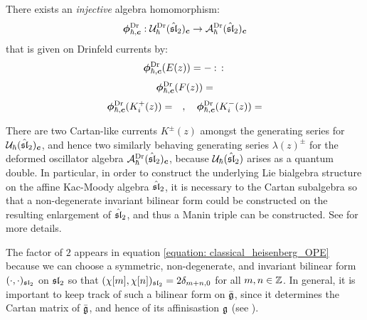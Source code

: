             \begin{proposition} \label{prop: free_boson_realisation_quantum_affine_sl_2_drinfeld_current_presentation}
                There exists an \textit{injective} algebra homomorphism:
                    \begin{equation} \label{equation: free_boson_realisation_quantum_affine_sl_2_drinfeld_current_presentation}
                        \freeboson^{\current}_{\hbar, \level}: \calU_{\hbar}^{\current}(\hat{\sl}_2)_{\level} \to \calA_{\hbar}^{\current}(\hat{\sl}_2)_{\level}
                    \end{equation}
                that is given on Drinfeld currents by:
                    \begin{equation}
                        \freeboson^{\current}_{\hbar, \level}( E(z) ) = -\order{  }
                    \end{equation}
                    \begin{equation}
                        \freeboson^{\current}_{\hbar, \level}( F(z) ) =
                    \end{equation}
                    \begin{equation}
                        \freeboson^{\current}_{\hbar, \level}( K_i^+(z) ) = \quad, \quad \freeboson^{\current}_{\hbar, \level}( K_i^-(z) ) =
                    \end{equation}
            \end{proposition}

            \begin{remark}
                There are two Cartan-like currents $K^{\pm}(z)$ amongst the generating series for $\calU_{\hbar}(\hat{\sl}_2)_{\level}$, and hence two similarly behaving generating series $\lambda(z)^{\pm}$ for the deformed oscillator algebra $\calA_{\hbar}^{\current}(\hat{\sl}_2)_{\level}$, because $\calU_{\hbar}(\hat{\sl}_2)$ arises as a quantum double. In particular, in order to construct the underlying Lie bialgebra structure on the affine Kac-Moody algebra $\hat{\sl}_2$, it is necessary to  the Cartan subalgebra so that a non-degenerate invariant bilinear form could be constructed on the resulting enlargement of $\hat{\sl}_2$, and thus a Manin triple can be constructed. See \cite{etingof_kazhdan_quantisation_6} for more details. 
            \end{remark}

            \begin{remark}
                The factor of $2$ appears in equation \eqref{equation: classical_heisenberg_OPE} because we can choose a symmetric, non-degenerate, and invariant bilinear form $(\cdot, \cdot)_{\sl_2}$ on $\sl_2$ so that $( \chi[m], \chi[n] )_{\sl_2} = 2 \delta_{m + n, 0}$ for all $m, n \in \Z$. In general, it is important to keep track of such a bilinear form on $\bar{\g}$, since it determines the Cartan matrix of $\bar{\g}$, and hence of its affinisastion $\g$ (see \cite[Chapter 7]{kac_infinite_dimensional_lie_algebras}).
            \end{remark}

